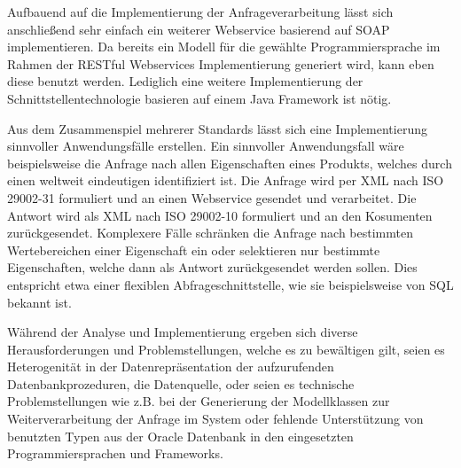 Aufbauend auf die Implementierung der Anfrageverarbeitung lässt sich anschließend sehr einfach ein weiterer \gls{Webservice} basierend auf \gls{SOAP} implementieren. Da bereits ein Modell für die gewählte Programmiersprache im Rahmen der \gls{REST}ful \glspl{Webservice} Implementierung generiert wird, kann eben diese benutzt werden. Lediglich eine weitere Implementierung der Schnittstellentechnologie basieren auf einem Java Framework ist nötig.  

Aus dem Zusammenspiel mehrerer Standards lässt sich eine Implementierung sinnvoller Anwendungsfälle erstellen. 
Ein sinnvoller Anwendungsfall wäre beispielsweise die Anfrage nach allen Eigenschaften eines Produkts, welches durch einen weltweit eindeutigen  identifiziert ist. Die Anfrage wird per XML nach ISO 29002-31 formuliert und an einen \gls{Webservice} gesendet und verarbeitet. Die Antwort wird als XML nach ISO 29002-10 formuliert und an den Kosumenten zurückgesendet. Komplexere Fälle schränken die Anfrage nach bestimmten Wertebereichen einer Eigenschaft ein oder selektieren nur bestimmte Eigenschaften, welche dann als Antwort zurückgesendet werden sollen. Dies entspricht etwa einer flexiblen \gls{Abfrageschnittstelle}, wie sie beispielsweise von SQL bekannt ist.  

Während der Analyse und Implementierung ergeben sich diverse Herausforderungen und Problemstellungen, welche es zu bewältigen gilt, seien es Heterogenität in der Datenrepräsentation der aufzurufenden Datenbankprozeduren, die Datenquelle, oder seien es technische Problemstellungen wie z.B. bei der Generierung der Modellklassen zur Weiterverarbeitung der Anfrage im System oder fehlende Unterstützung von benutzten Typen aus der Oracle Datenbank in den eingesetzten Programmiersprachen und Frameworks.  




